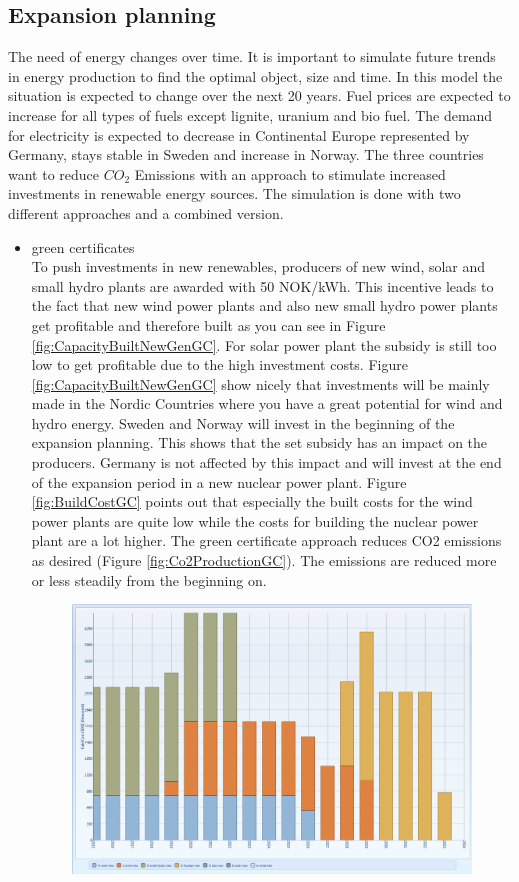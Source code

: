 \documentclass{article}
\begin{document}
\subsection{Expansion planning}
The need of energy changes over time. It is important to simulate future trends in energy production to find the optimal object, size and time. In this model the situation is expected to change over the next 20 years. Fuel prices are expected to increase for all types of fuels except lignite, uranium and bio fuel. The demand for electricity is expected to decrease in Continental Europe represented by Germany, stays stable in Sweden and increase in Norway. The three countries want to reduce $CO_2$ Emissions with an approach to stimulate increased investments in renewable energy sources. The simulation is done with two different approaches and a combined version.
\begin{itemize}
\item green certificates\\
To push investments in new renewables, producers of new wind, solar and small hydro plants are awarded with 50 NOK/kWh. This incentive leads to the fact that new wind power plants and also new small hydro power plants get profitable and therefore built as you can see in Figure \ref{fig:CapacityBuiltNewGenGC}. For solar power plant the subsidy is still too low to get profitable due to the high investment costs. Figure \ref{fig:CapacityBuiltNewGenGC} show nicely that investments will be mainly made in the Nordic Countries where you have a great potential for wind and hydro energy. Sweden and Norway will invest in the beginning of the expansion planning. This shows that the set subsidy has an impact on the producers. Germany is not affected by this impact and will invest at the end of the expansion period in a new nuclear power plant. Figure \ref{fig:BuildCostGC} points out that especially the built costs for the wind power plants are quite low while the costs for building the nuclear power plant are a lot higher. The green certificate approach reduces CO2 emissions as desired (Figure \ref{fig:Co2ProductionGC}). The emissions are reduced more or less steadily from the beginning on.
\begin{figure}[htbp]
\begin{center}
\includegraphics[width=13cm,keepaspectratio=true]{figures/Expansion/GreenCertificate/BuildCostGC}

\end{center}
\end{figure}
\end{itemize}
\end{document}
